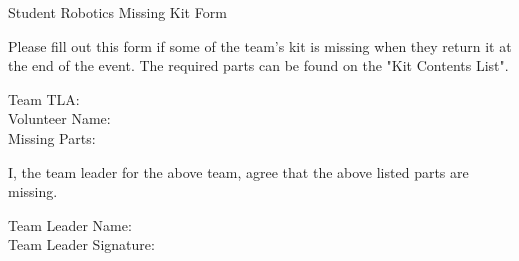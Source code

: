 \documentclass[a4paper, 12pt]{article}
\begin{document}
\begin{center}

    {\huge{Student Robotics Missing Kit Form}}

    \medskip

\end{center}

Please fill out this form if some of the team's kit is missing when they return it at the end of the event. The required parts can be found on the "Kit Contents List". \\

\bigskip

{\large{Team TLA}: \hrulefill} \\

{\large{Volunteer Name}: \hrulefill} \\

{\large{Missing Parts}:}

\vspace*{\fill}

I, the team leader for the above team, agree that the above listed parts are missing. \\

\bigskip

{\large{Team Leader Name}: \hrulefill} \\

{\large{Team Leader Signature}: \hrulefill} \\
\end{document}
